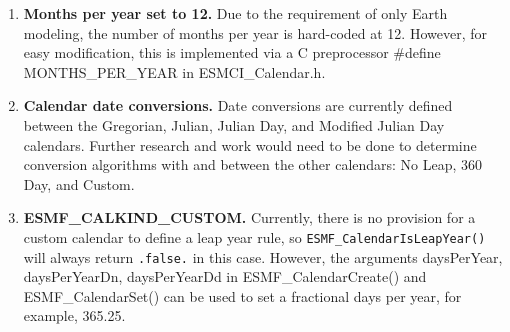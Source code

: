 
\label{subsec:Calendar_rest}

\begin{enumerate}

\item {\bf Months per year set to 12.} Due to the requirement of only Earth modeling, the number of months per year is hard-coded at 12.  However, for easy modification, this is implemented via a C preprocessor \#define MONTHS\_PER\_YEAR in ESMCI\_Calendar.h.

\item {\bf Calendar date conversions.} Date conversions are currently defined between the Gregorian, Julian, Julian Day, and Modified Julian Day calendars. Further research and work would need to be done to determine conversion algorithms with and between the other calendars:  No Leap, 360 Day, and Custom.

\item {\bf ESMF\_CALKIND\_CUSTOM.} Currently, there is no provision for a custom calendar to define a leap year rule, so {\tt ESMF\_CalendarIsLeapYear()} will always return {\tt .false.} in this case.  However, the arguments daysPerYear,
daysPerYearDn, daysPerYearDd in ESMF\_CalendarCreate() and ESMF\_CalendarSet() can be used to set a fractional days per year, for example, 365.25.

\end{enumerate}
